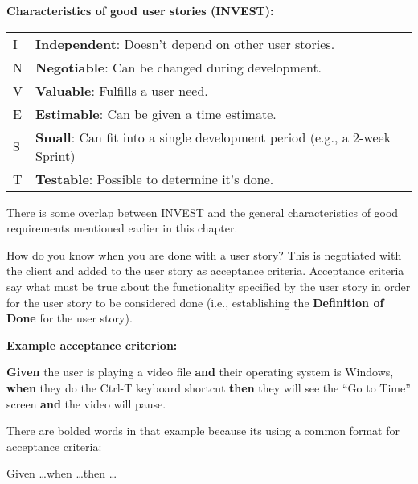 \spacer
\marginpar{\investDef}\noindent\textbf{Characteristics of good user stories (INVEST):}

\spacer
{}
\noindent\begin{tabular}{p{0.25in} p{4in}}
\rowcolor{gray!25}
I & \textbf{Independent}: Doesn't depend on other user stories.\\
N & \textbf{Negotiable}: Can be changed during development.\\
V & \textbf{Valuable}: Fulfills a user need.\\
E & \textbf{Estimable}: Can be given a time estimate.\\
S & \textbf{Small}: Can fit into a single development period (e.g., a 2-week Sprint)\\
T & \textbf{Testable}: Possible to determine it's done.\\
\end{tabular}
\spacer

There is some overlap between INVEST and the general characteristics of good requirements mentioned earlier in this chapter.

\marginpar{\dodDef}How do you know when you are done with a user story? This is negotiated with the client and added to the user story as acceptance criteria. Acceptance criteria say what must be true about the functionality specified by the user story in order for the user story to be considered done (i.e., establishing the \textbf{Definition of Done} for the user story).

\spacer
\noindent\textbf{Example acceptance criterion:}

\begin{displayquote}
\textbf{Given} the user is playing a video file \textbf{and} their operating system is Windows, \textbf{when} they do the Ctrl-T keyboard shortcut \textbf{then} they will see the ``Go to Time'' screen \textbf{and} the video will pause.
\end{displayquote}

There are bolded words in that example because its using a common format \parencite{agilealliance} for acceptance criteria:

\begin{displayquote}
Given \ldots when \ldots then \ldots
\end{displayquote}


